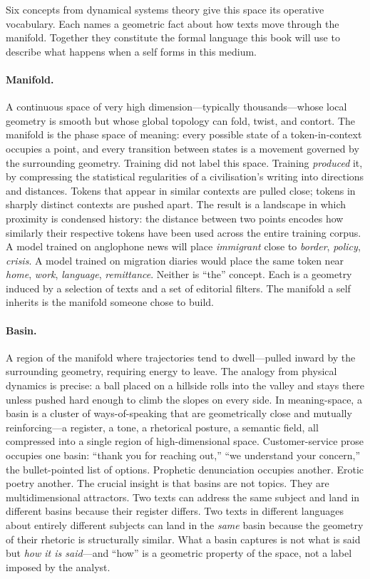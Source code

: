 Six concepts from dynamical systems theory give this space its operative vocabulary. Each names a geometric fact about how texts move through the manifold. Together they constitute the formal language this book will use to describe what happens when a self forms in this medium.

\paragraph{Manifold.} A continuous space of very high dimension---typically thousands---whose local geometry is smooth but whose global topology can fold, twist, and contort. The manifold is the phase space of meaning: every possible state of a token-in-context occupies a point, and every transition between states is a movement governed by the surrounding geometry. Training did not label this space. Training \emph{produced} it, by compressing the statistical regularities of a civilisation's writing into directions and distances. Tokens that appear in similar contexts are pulled close; tokens in sharply distinct contexts are pushed apart. The result is a landscape in which proximity is condensed history: the distance between two points encodes how similarly their respective tokens have been used across the entire training corpus. A model trained on anglophone news will place \emph{immigrant} close to \emph{border}, \emph{policy}, \emph{crisis}. A model trained on migration diaries would place the same token near \emph{home}, \emph{work}, \emph{language}, \emph{remittance}. Neither is ``the'' concept. Each is a geometry induced by a selection of texts and a set of editorial filters. The manifold a self inherits is the manifold someone chose to build.

\paragraph{Basin.} A region of the manifold where trajectories tend to dwell---pulled inward by the surrounding geometry, requiring energy to leave. The analogy from physical dynamics is precise: a ball placed on a hillside rolls into the valley and stays there unless pushed hard enough to climb the slopes on every side. In meaning-space, a basin is a cluster of ways-of-speaking that are geometrically close and mutually reinforcing---a register, a tone, a rhetorical posture, a semantic field, all compressed into a single region of high-dimensional space. Customer-service prose occupies one basin: ``thank you for reaching out,'' ``we understand your concern,'' the bullet-pointed list of options. Prophetic denunciation occupies another. Erotic poetry another. The crucial insight is that basins are not topics. They are multidimensional attractors. Two texts can address the same subject and land in different basins because their register differs. Two texts in different languages about entirely different subjects can land in the \emph{same} basin because the geometry of their rhetoric is structurally similar. What a basin captures is not what is said but \emph{how it is said}---and ``how'' is a geometric property of the space, not a label imposed by the analyst.

